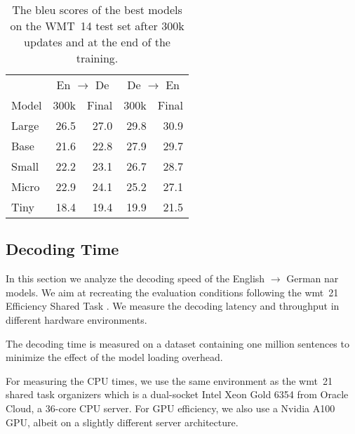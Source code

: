 



\begin{table}
  \centering

  \begin{tabular}{lrrrr}
    \toprule
    & \multicolumn{2}{c}{En $\rightarrow$ De}
    & \multicolumn{2}{c}{De $\rightarrow$ En} \\
    Model
    & 300k & Final & 300k & Final \\
    \midrule

    Large & 26.5 & 27.0 & 29.8 & 30.9 \\
    Base & 21.6 & 22.8 & 27.9 & 29.7 \\
    Small & 22.2 & 23.1 & 26.7 & 28.7 \\
    Micro & 22.9 & 24.1 & 25.2 & 27.1 \\
    Tiny & 18.4 & 19.4 & 19.9 & 21.5 \\
    \bottomrule
  \end{tabular}

  \caption{The \acs{bleu} scores of the best models on the WMT~14 test set
    after 300k updates and at the end of the training. }
  \label{tab:wmt14-bleu-scores}
\end{table}

\subsection{Decoding Time}%
\label{subsec:results:time}

In this section we analyze the decoding speed of the English $\rightarrow$
German \ac{nar} models. We aim at recreating the evaluation conditions
following the \acs{wmt}~21 Efficiency Shared Task
\citep{heafield-etal-2021-findings}. We measure the decoding latency and
throughput in different hardware environments.

The decoding time is measured on a dataset containing one million sentences to
minimize the effect of the model loading overhead.

For measuring the CPU times, we use the same environment as the \acs{wmt}~21
shared task organizers which is a dual-socket Intel Xeon Gold 6354 from Oracle
Cloud, a 36-core CPU server. For GPU efficiency, we also use a Nvidia A100 GPU,
albeit on a slightly different server architecture. 

